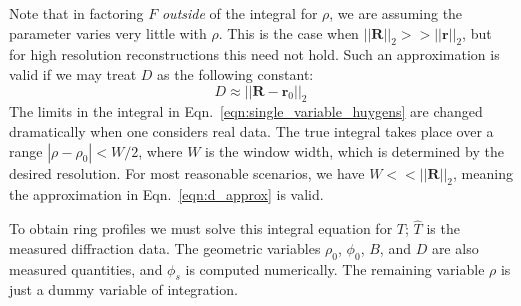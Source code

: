 \documentclass{article}
\theoremstyle{plain}
\begin{document}
        Note that in factoring $F$ \textit{outside} of the integral for
        $\rho$, we are assuming the parameter varies very little with $\rho$.
        This is the case when $||\mathbf{R}||_{2}>>||\mathbf{r}||_{2}$, but
        for high resolution reconstructions this need not hold.
        Such an approximation is valid if we may
        treat $D$ as the following constant:
        \begin{equation}
            \label{eqn:d_approx}
            D\approx||\mathbf{R}-\mathbf{r}_{0}||_{2}
        \end{equation}
        The limits in the integral in Eqn.~\ref{eqn:single_variable_huygens}
        are changed dramatically when one considers real data. The true
        integral takes place over a range $|\rho-\rho_{0}|<W/2$, where $W$ is
        the window width, which is determined by the desired resolution.
        For most reasonable scenarios, we have $W<<||\mathbf{R}||_{2}$,
        meaning the approximation in Eqn.~\ref{eqn:d_approx} is valid.
        \par\hfill\par
        To obtain ring profiles we must solve this integral equation for $T$;
        $\hat{T}$ is the measured diffraction data.
        The geometric variables $\rho_{0}$, $\phi_{0}$, $B$, and $D$ are also
        measured quantities, and $\phi_{s}$ is computed numerically.
        The remaining variable $\rho$ is just a dummy variable of integration.
\end{document}
